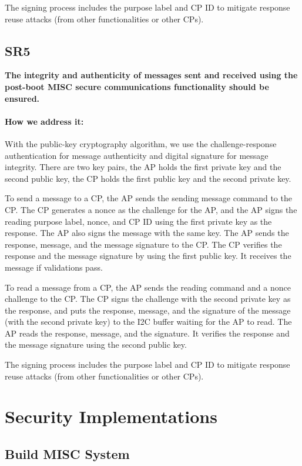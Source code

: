 \documentclass[11pt,oneside,onecolumn,letterpaper]{article}
\newcounter{alg}
\begin{document}
	The signing process includes the purpose label and CP ID to mitigate response reuse attacks (from other functionalities or other CPs).
	
	\subsection{SR5}
	\textbf{The integrity and authenticity of messages sent and received using the post-boot MISC secure communications functionality should be ensured.}
	\paragraph{How we address it:}
	With the public-key cryptography algorithm,
	we use the challenge-response authentication for message authenticity and digital signature for message integrity.
	There are two key pairs,
	the AP holds the first private key and the second public key,
	the CP holds the first public key and the second private key.
	
	To send a message to a CP,
	the AP sends the sending message command to the CP.
	The CP generates a nonce as the challenge for the AP,
	and the AP signs the reading purpose label,
	nonce,
	and CP ID using the first private key as the response.
	The AP also signs the message with the same key.
	The AP sends the response,
	message,
	and the message signature to the CP.
	The CP verifies the response and the message signature by using the first public key.
	It receives the message if validations pass.
	
	To read a message from a CP,
	the AP sends the reading command and a nonce challenge to the CP.
	The CP signs the challenge with the second private key as the response,
	and puts the response,
	message,
	and the signature of the message (with the second private key) to the I2C buffer waiting for the AP to read.
	The AP reads the response,
	message,
	and the signature.
	It verifies the response and the message signature using the second public key.
	
	The signing process includes the purpose label and CP ID to mitigate response reuse attacks (from other functionalities or other CPs).
	
	
	\section{Security Implementations}
	
	
	\subsection{Build MISC System}
\end{document}
